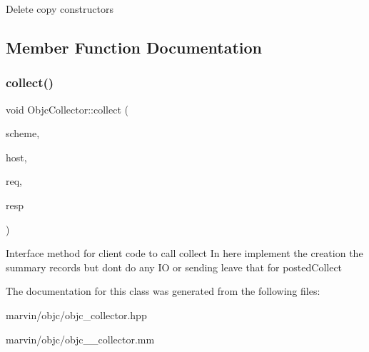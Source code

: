 Delete copy constructors 

\subsection{Member Function Documentation}
\mbox{\label{class_objc_collector_a9518ac372bd2ef1d765bb715730c1f6c}} 
\subsubsection{\texorpdfstring{collect()}{collect()}}
{\footnotesize\ttfamily void Objc\+Collector\+::collect (\begin{DoxyParamCaption}\item[{std\+::string \&}]{scheme,  }\item[{std\+::string \&}]{host,  }\item[{Message\+Reader\+S\+Ptr}]{req,  }\item[{Message\+Writer\+S\+Ptr}]{resp }\end{DoxyParamCaption})}

Interface method for client code to call collect In here implement the creation the summary records but dont do any IO or sending leave that for posted\+Collect

The documentation for this class was generated from the following files\+:\begin{DoxyCompactItemize}
\item 
marvin/objc/objc\+\_\+collector.\+hpp\item 
marvin/objc/objc\+\_\+\+\_\+collector.\+mm\end{DoxyCompactItemize}
